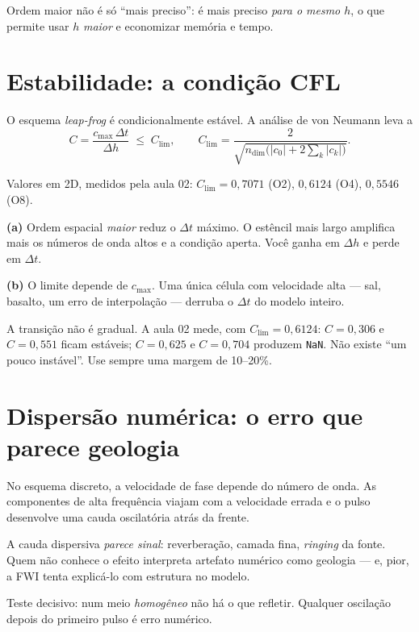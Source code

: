 \documentclass[11pt,a4paper,oneside]{report}
\begin{document}
Ordem maior não é só ``mais preciso'': é mais preciso \emph{para o mesmo $h$},
o que permite usar $h$ \emph{maior} e economizar memória e tempo.

\section{Estabilidade: a condição CFL}

O esquema \emph{leap-frog} é condicionalmente estável. A análise de von
Neumann leva a
\begin{equation}
C = \frac{c_{\max}\,\Delta t}{\Delta h} \;\le\; C_{\lim},
\qquad
C_{\lim} = \frac{2}{\sqrt{n_{\dim}\bigl(|c_0| + 2\sum_k |c_k|\bigr)}} .
\label{eq:cfl}
\end{equation}

Valores em 2D, medidos pela aula 02: $C_{\lim} = 0{,}7071$ (O2),
$0{,}6124$ (O4), $0{,}5546$ (O8).

\begin{atencao}
\textbf{(a)} Ordem espacial \emph{maior} reduz o $\Delta t$ máximo. O estêncil
mais largo amplifica mais os números de onda altos e a condição aperta. Você
ganha em $\Delta h$ e perde em $\Delta t$.

\textbf{(b)} O limite depende de $c_{\max}$. Uma única célula com velocidade
alta --- sal, basalto, um erro de interpolação --- derruba o $\Delta t$ do
modelo inteiro.
\end{atencao}

A transição não é gradual. A aula 02 mede, com $C_{\lim}=0{,}6124$:
$C = 0{,}306$ e $C = 0{,}551$ ficam estáveis; $C = 0{,}625$ e $C = 0{,}704$
produzem \texttt{NaN}. Não existe ``um pouco instável''. Use sempre uma margem
de 10--20\%.

\section{Dispersão numérica: o erro que parece geologia}

No esquema discreto, a velocidade de fase depende do número de onda. As
componentes de alta frequência viajam com a velocidade errada e o pulso
desenvolve uma cauda oscilatória atrás da frente.

\begin{armadilha}
A cauda dispersiva \emph{parece sinal}: reverberação, camada fina,
\emph{ringing} da fonte. Quem não conhece o efeito interpreta artefato
numérico como geologia --- e, pior, a FWI tenta explicá-lo com estrutura no
modelo.

Teste decisivo: num meio \emph{homogêneo} não há o que refletir. Qualquer
oscilação depois do primeiro pulso é erro numérico.
\end{armadilha}
\end{document}
